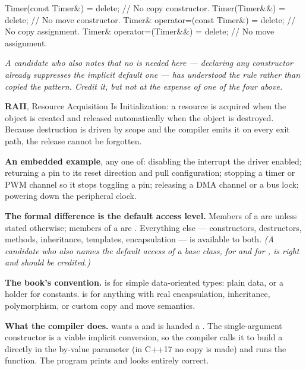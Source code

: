 \begin{cppcode}
Timer(const Timer&)            = delete; // No copy constructor.
Timer(Timer&&)                 = delete; // No move constructor.
Timer& operator=(const Timer&) = delete; // No copy assignment.
Timer& operator=(Timer&&)      = delete; // No move assignment.
\end{cppcode}

\noindent\textit{A candidate who also notes that no  is needed here ---
declaring any constructor already suppresses the implicit default one --- has understood the rule
rather than copied the pattern. Credit it, but not at the expense of one of the four above.}

\textbf{RAII}, Resource Acquisition Is Initialization: a resource is acquired when the object is
created and released automatically when the object is destroyed. Because destruction is driven by
scope and the compiler emits it on every exit path, the release cannot be forgotten. 

\textbf{An embedded example}, any one of: disabling the interrupt the driver enabled; returning a
pin to its reset direction and pull configuration; stopping a timer or PWM channel so it stops
toggling a pin; releasing a DMA channel or a bus lock; powering down the peripheral clock.


\textbf{The formal difference is the default access level.} Members of a  are
 unless stated otherwise; members of a  are . Everything else
--- constructors, destructors, methods, inheritance, templates, encapsulation --- is available to
both. \textit{(A candidate who also names the default access of a base class,  for
 and  for , is right and should be credited.)} 

\textbf{The book's convention.}  is for simple data-oriented types: plain data, or a
holder for  constants.  is for anything with real encapsulation,
inheritance, polymorphism, or custom copy and move semantics. 

\textbf{What the compiler does.}  wants a  and is handed a
. The single-argument constructor is a viable implicit conversion, so the
compiler calls it to build a  directly in the by-value parameter (in C++17 no
copy is made) and runs the function. The program prints  and looks entirely
correct. 

